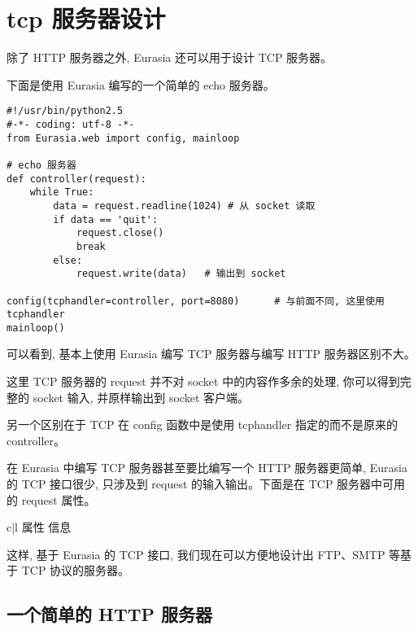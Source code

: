 \documentclass{manual}
\begin{document}
\section{tcp 服务器设计}

除了 HTTP 服务器之外, Eurasia 还可以用于设计 TCP 服务器。

下面是使用 Eurasia 编写的一个简单的 echo 服务器。

\begin{verbatim}
#!/usr/bin/python2.5
#-*- coding: utf-8 -*-
from Eurasia.web import config, mainloop

# echo 服务器
def controller(request):
	while True:
		data = request.readline(1024) # 从 socket 读取
		if data == 'quit':
			request.close()
			break
		else:
			request.write(data)   # 输出到 socket

config(tcphandler=controller, port=8080)      # 与前面不同, 这里使用 tcphandler
mainloop()
\end{verbatim}

可以看到, 基本上使用 Eurasia 编写 TCP 服务器与编写 HTTP 服务器区别不大。

这里 TCP 服务器的 request 并不对 socket 中的内容作多余的处理, 你可以得到完整的 socket 输入, 并原样输出到 socket 客户端。

另一个区别在于 TCP 在 config 函数中是使用 tcphandler 指定的而不是原来的 controller。

在 Eurasia 中编写 TCP 服务器甚至要比编写一个 HTTP 服务器更简单, Eurasia 的 TCP 接口很少, 只涉及到 request 的输入输出。下面是在 TCP 服务器中可用的 request 属性。

\begin{tableii}{c|l}{}{ 属性 }{ 信息 }
\end{tableii}

这样, 基于 Eurasia 的 TCP 接口, 我们现在可以方便地设计出 FTP、SMTP 等基于 TCP 协议的服务器。


\subsection{一个简单的 HTTP 服务器}
\end{document}
